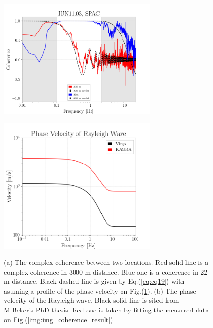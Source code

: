 \documentclass[a4paper,12pt]{book}
\begin{document}
\begin{figure}[H] 
 \begin{minipage}{0.5\hsize}
  \begin{center}
    \includegraphics[width=8.0cm]{./img_coherence_result.png}    
  \end{center}
  \subcaption{}  
  \label{img:img_coherence_result}
 \end{minipage}
 \begin{minipage}{0.5\hsize}
  \begin{center}
    \includegraphics[width=8.0cm]{./img_RwaveVelocity.png}    
  \end{center}
  \subcaption{}
  \label{img:img_RwaveVelocity}  
 \end{minipage}
  \caption{(a) The complex coherence between two locations. Red solid line is a complex coherence in 3000 m distance. Blue one is a coherence in 22 m distance. Black dashed line is given by Eq.(\ref{eq:eq19}) with asuming a profile of the phase velocity on Fig.(\ref{img:img_RwaveVelocity}). (b) The phase velocity of the Rayleigh wave. Black solid line is sited from M.Beker's PhD thesis. Red one is taken by fitting the measured data on Fig.(\ref{img:img_coherence_result})} 
\end{figure}
\end{document}
